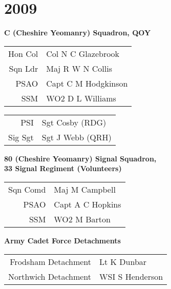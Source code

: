 \chapter*{2009}

\vspace*{10mm}

\begin{center}
  \Large
  \textbf{C (Cheshire Yeomanry) Squadron, QOY}
\end{center}

\begin{center}
  \begin{tabular}{rl}
    Hon Col & Col N C Glazebrook \\
    Sqn Ldr & Maj R W N Collis \\
    PSAO & Capt C M Hodgkinson \\
    SSM & WO2 D L Williams \\
  \end{tabular}
\end{center}

\begin{center}
  \begin{tabular}{rl}
    PSI & Sgt Cosby (RDG) \\
    Sig Sgt & Sgt J Webb (QRH) \\
  \end{tabular}
\end{center}

\vspace*{10mm}

\begin{center}
  \Large
  \textbf{80 (Cheshire Yeomanry) Signal Squadron, \\ 33 Signal Regiment (Volunteers)}
\end{center}

\begin{center}
  \begin{tabular}{rl}
    Sqn Comd & Maj M Campbell \\
    PSAO & Capt A C Hopkins \\
    SSM & WO2 M Barton \\
  \end{tabular}
\end{center}

\vspace*{10mm}

\begin{center}
  \Large
  \textbf{Army Cadet Force Detachments}
\end{center}

\begin{center}
  \begin{tabular}{rl}
    Frodsham Detachment & Lt K Dunbar \\
    Northwich Detachment & WSI S Henderson \\
  \end{tabular}
\end{center}
